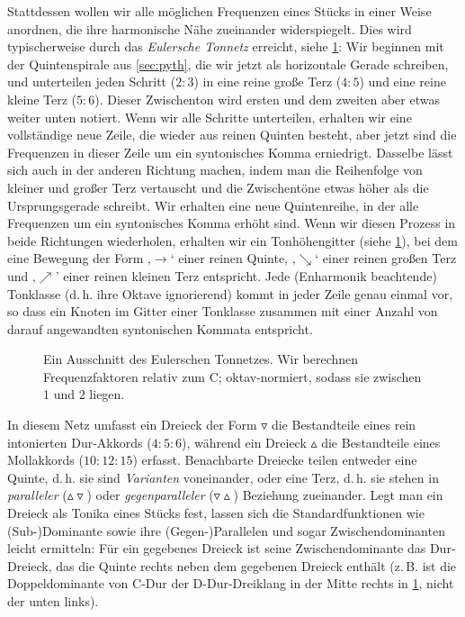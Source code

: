 Stattdessen wollen wir alle möglichen Frequenzen eines Stücks in einer Weise
anordnen, die ihre harmonische Nähe zueinander widerspiegelt. Dies wird
typischerweise durch das \emph{Eulersche Tonnetz} erreicht, siehe
\cref{fig:latticeExcerpt}: Wir beginnen mit der Quintenspirale aus
\cref{sec:pyth}, die wir jetzt als horizontale Gerade schreiben, und unterteilen
jeden Schritt ($2:3$) in eine reine große Terz ($4:5$) und eine reine kleine
Terz ($5:6$). Dieser Zwischenton wird ersten und dem zweiten aber etwas weiter
unten notiert. Wenn wir alle Schritte unterteilen, erhalten wir eine
vollständige neue Zeile, die wieder aus reinen Quinten besteht, aber jetzt sind
die Frequenzen in dieser Zeile um ein syntonisches Komma erniedrigt. Dasselbe
lässt sich auch in der anderen Richtung machen, indem man die Reihenfolge von
kleiner und großer Terz vertauscht und die Zwischentöne etwas höher als die
Ursprungsgerade schreibt. Wir erhalten eine neue Quintenreihe, in der alle
Frequenzen um ein syntonisches Komma erhöht sind. Wenn wir diesen Prozess in
beide Richtungen wiederholen, erhalten wir ein Tonhöhengitter (siehe
\cref{fig:latticeExcerpt}), bei dem eine Bewegung der Form ‚$\to$‘ einer reinen
Quinte, ‚$\searrow$‘ einer reinen großen Terz und ‚$\nearrow$’ einer reinen
kleinen Terz entspricht. Jede (Enharmonik beachtende) Tonklasse (d.\,h. ihre
Oktave ignorierend) kommt in jeder Zeile genau einmal vor, so dass ein Knoten im
Gitter einer Tonklasse zusammen mit einer Anzahl von darauf angewandten
syntonischen Kommata entspricht.

\begin{figure}[h]
  
  \caption{Ein Ausschnitt des Eulerschen Tonnetzes. Wir berechnen
  	Frequenzfaktoren relativ zum C; oktav-normiert, sodass sie zwischen $1$
  	und $2$ liegen.}\label{fig:latticeExcerpt}
\end{figure}

In diesem Netz umfasst ein Dreieck der Form $\triangledown$ die Bestandteile
eines rein intonierten Dur-Akkords ($4:5:6$), während ein Dreieck $\vartriangle$
die Bestandteile eines Mollakkords ($10:12:15$) erfasst. Benachbarte Dreiecke
teilen entweder eine Quinte, d.\,h. sie sind \emph{Varianten} voneinander, oder
eine Terz, d.\,h. sie stehen in \emph{paralleler}
($\vartriangle\!\!\!\triangledown$) oder \emph{gegenparalleler}
($\triangledown\!\!\!\vartriangle$) Beziehung zueinander. Legt man ein Dreieck
als Tonika eines Stücks fest, lassen sich die Standardfunktionen wie
(Sub-)Dominante sowie ihre (Gegen-)Parallelen und sogar Zwischendominanten
leicht ermitteln: Für ein gegebenes Dreieck ist seine Zwischendominante das
Dur-Dreieck, das die Quinte rechts neben dem gegebenen Dreieck enthält (z.\,B.
ist die Doppeldominante von C-Dur der D-Dur-Dreiklang in der Mitte rechts in
\cref{fig:latticeExcerpt}, nicht der unten links).


